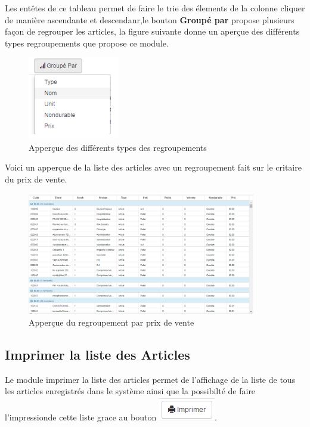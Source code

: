 \documentclass[12pt,a4paper]{report}
\begin{document}
Les entêtes de ce tableau permet de faire le trie des élements de la colonne cliquer de manière ascendante et descendanr,le bouton \textbf{Groupé par} propose plusieurs façon de regrouper les articles, la figure suivante donne un aperçue des différents types regroupements que propose ce module.

\begin{figure}[h]
\begin{center}
\includegraphics[width=4cm]{pic/GroupeParItem.png}
\end{center}
\caption{Apperçue des différents types des regroupements}
\label{Apperçue des différents types des regroupements}
\end{figure}

\newpage
Voici un apperçue de la liste des articles avec un regroupement fait sur le critaire du prix de vente.

\begin{figure}[h]
\begin{center}
\includegraphics[width=10cm]{pic/GroupPrice.png}
\end{center}
\caption{Apperçue du regroupement par prix de vente}
\label{Apperçue du regroupement par prix de vente}
\end{figure}

\newpage
\subsection{Imprimer la liste des Articles}
Le module imprimer la liste des articles permet de l'affichage de la liste de tous les articles enregistrés dans le système ainsi que la possibilté de faire l'impressionde cette liste grace au bouton \includegraphics[scale=0.7]{pic/Imprint.png}.
\end{document}
